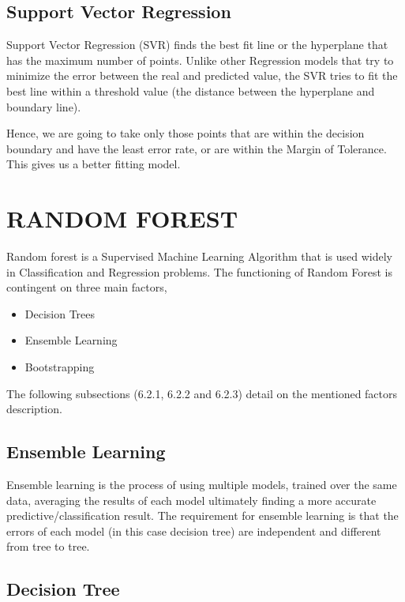 \subsection{Support Vector Regression}

Support Vector Regression (SVR) finds the best fit line or the hyperplane that has the maximum number of points. Unlike other Regression models that try to minimize the error between the real and predicted value, the SVR tries to fit the best line within a threshold value (the distance between the hyperplane and boundary line). 

Hence, we are going to take only those points that are within the decision boundary and have the least error rate, or are within the Margin of Tolerance. This gives us a better fitting model.

\newpage

\section{RANDOM FOREST}

Random forest is a Supervised Machine Learning Algorithm that is used widely in Classification and Regression problems. The functioning of Random Forest is contingent on three main factors, 

\begin{itemize}
    \item Decision Trees
    \item Ensemble Learning
    \item Bootstrapping
\end{itemize}

The following subsections (6.2.1, 6.2.2 and 6.2.3) detail on the mentioned factors description. 

\subsection{Ensemble Learning}

Ensemble learning is the process of using multiple models, trained over the same data, averaging the results of each model ultimately finding a more accurate predictive/classification result. The requirement for ensemble learning is that the errors of each model (in this case decision tree) are independent and different from tree to tree.

\subsection{Decision Tree}

